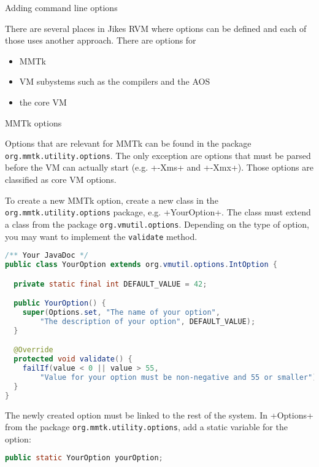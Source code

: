 \begin{section}{Adding command line options}
\label{sec:addingcommandlineoptions}

There are several places in Jikes RVM where options can be defined and each of those uses another approach. There are options for
\begin{itemize}
\item MMTk
\item VM subystems such as the compilers and the AOS
\item the core VM
\end{itemize}

\begin{subsection}{MMTk options}

Options that are relevant for MMTk can be found in the package \texttt{org.mmtk.uti\-li\-ty.options}. The only exception are options that must be parsed before the VM can actually start (e.g. \spverb+-Xms+ and \spverb+-Xmx+). Those options are classified as core VM options.

To create a new MMTk option, create a new class in the \texttt{org.mmtk.uti\-li\-ty.options} package, e.g. \spverb+YourOption+. The class must extend a class from the package \texttt{org.vm\-util.options}. Depending on the type of option, you may want to implement the \texttt{validate} method.

\begin{lstlisting}[language=Java,title=YourOption.java]
/** Your JavaDoc */
public class YourOption extends org.vmutil.options.IntOption {

  private static final int DEFAULT_VALUE = 42;

  public YourOption() {
    super(Options.set, "The name of your option",
        "The description of your option", DEFAULT_VALUE);
  }

  @Override
  protected void validate() {
    failIf(value < 0 || value > 55,
        "Value for your option must be non-negative and 55 or smaller");
  }
}
\end{lstlisting}

The newly created option must be linked to the rest of the system. In \spverb+Options+ from the package \texttt{org.mmtk.uti\-li\-ty.options}, add a static variable for the option:
\begin{lstlisting}[language=Java,title=Options.java]
public static YourOption yourOption;
\end{lstlisting}


\end{subsection}
\end{section}
